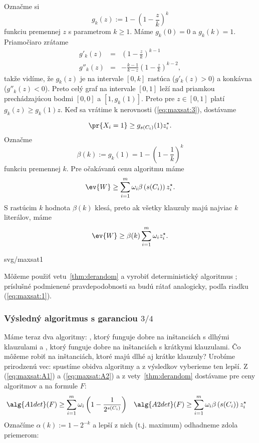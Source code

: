 Označme si 
$$g_k(z):=1-\left(1-\frac{z}{k}\right)^k$$
funkciu premennej $z$ s parametrom $k\ge1$. Máme $g_k(0)=0$ a  $g_k(k)=1$. Priamočiaro zrátame
\begin{eqnarray*}
g'_k(z) &=& \left(1-\frac{z}{k}\right)^{k-1} \\
g''_k(z) &=& -\frac{k-1}{k-z}\left(1-\frac{z}{k}\right)^{k-2},
\end{eqnarray*}
takže vidíme, že $g_k(z)$ je 
na intervale $[0,k]$ rastúca ($g'_k(z)>0$) a konkávna ($g''_k(z)<0$). Preto celý graf na intervale $[0,1]$ 
leží nad priamkou 
prechádzajúcou bodmi $[0,0]$ a $[1,g_k(1)]$.
Preto pre $z\in[0,1]$ platí $g_k(z)\ge g_k(1)z$. Keď sa vrátime k nerovnosti (\ref{eq:maxsat:3}),
dostávame


\noindent
\begin{minipage}[t]{0.5\textwidth}
$$\pr{X_i=1}\ge g_{s(C_i)}(1)z_i^\star.$$
Označme $$\beta(k):=g_k(1)=1-\left(1-\frac{1}{k}\right)^k$$ funkciu premennej $k$.
Pre očakávanú cenu algoritmu  máme
\begin{equation}
\label{eq:maxsat:A2}
\ev{W}\ge\sum_{i=1}^m\omega_i\beta\left(s(C_i)\right)z_i^\star.
\end{equation}
S rastúcim $k$ hodnota $\beta(k)$ klesá, preto ak všetky klauzuly majú najviac $k$ literálov, máme
$$\ev{W}\ge\beta(k)\sum_{i=1}^m\omega_iz_i^\star.$$
\end{minipage}\hspace*{0.05\textwidth}\begin{minipage}[t]{0.45\textwidth}
\begin{myfig}{\textwidth}{svg/maxsat1}
\end{myfig}
\end{minipage}

\vspace*{-3ex}
\noindent
Môžeme použiť vetu~\ref{thm:derandom} a vyrobiť deterministický algoritmus ;
príslušné podmienené pravdepodobnosti sa budú rátať analogicky, podľa riadku (\ref{eq:maxsat:1}).

\subsubsection*{Výsledný algoritmus s garanciou $3/4$ }

\noindent
Máme teraz dva algoritmy: , ktorý funguje dobre na inštanciách s dlhými klauzulami a 
, ktorý funguje dobre na inštanciách s krátkymi klauzulami. Čo môžeme robiť 
na inštanciách, ktoré majú dlhé aj krátke klauzuly?
Urobíme prirodzenú vec: spustíme obidva algoritmy a z výsledkov vyberieme ten lepší.
Z (\ref{eq:maxsat:A1}) a (\ref{eq:maxsat:A2}) a z vety~\ref{thm:derandom} dostávame pre 
ceny algoritmov  a  na formule $F$:
\begin{align*}
  \alg{A1det}(F) & \ge \sum_{i=1}^m\omega_i\left(1-\frac{1}{2^{s(C_i)}}\right) &
\alg{A2det}(F) & \ge \sum_{i=1}^m\omega_i\beta\left(s(C_i)\right)z_i^\star
\end{align*}
Označíme $\alpha(k):=1-2^{-k}$ a 
lepší z nich (t.j. maximum) odhadneme zdola priemerom:


